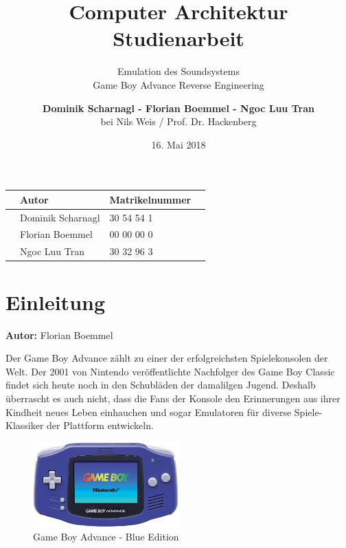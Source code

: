 \documentclass[11pt,a4paper]{scrartcl}
\title{\vspace{5cm}\huge Computer Architektur \\ \Large Studienarbeit \vspace{1cm}}
\subtitle{\Huge Emulation des Soundsystems \\ \Large Game Boy Advance Reverse Engineering \vspace{1cm}}
\author{\large \textbf{Dominik Scharnagl - Florian Boemmel - Ngoc Luu Tran}\\ \normalsize bei Nils Weis / Prof. Dr. Hackenberg}
\date{\normalsize 16. Mai 2018}
\newcommand{\AutorFlorian} {
    \vspace{-4mm}
    \large \textbf{Autor:} Florian Boemmel \normalsize
    \vspace{2mm}
}
\begin{document}
\sffamily

\maketitle
\thispagestyle{empty}

\vspace{5cm}
\begin{table}[h]
    \centering
    \begin{tabular}{ p{4cm} p{5cm}|p{5cm} p{2cm} }
        & \textbf{Autor} & \textbf{Matrikelnummer} & \\
        \hline
        & Dominik Scharnagl & 30 54 54 1 & \\
        & Florian Boemmel & 00 00 00 0 & \\
        & Ngoc Luu Tran & 30 32 96 3 &
    \end{tabular}
\end{table}


\clearpage

\setcounter{page}{1}


\tableofcontents
\clearpage
{}


\printindex
\clearpage


\section{Einleitung} \label{Einleitung}
\AutorFlorian

Der Game Boy Advance z\"ahlt zu einer der erfolgreichsten Spielekonsolen der Welt. Der 2001 von Nintendo \cite{NintendoGeschichte} ver\"offentlichte Nachfolger des Game Boy Classic findet sich heute noch in den Schubl\"aden der damalilgen Jugend. Deshalb \"uberrascht es auch nicht, dass die Fans der Konsole den Erinnerungen aus ihrer Kindheit neues Leben einhauchen und sogar Emulatoren f\"ur diverse Spiele-Klassiker der Plattform entwickeln.

\begin{figure}[h]
    \centering
    \includegraphics[width=0.5\textwidth]{GameBoyAdvance}
    \caption{Game Boy Advance - Blue Edition}
    \label{fig:gba}
\end{figure}
\end{document}
